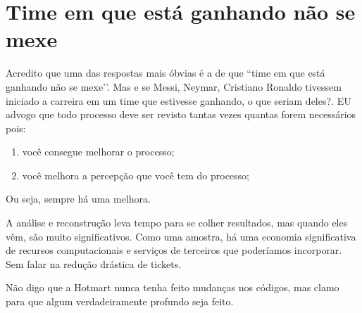 \section{Time em que está ganhando não se mexe}

Acredito que uma das respostas mais óbvias é a de que ``time em que está ganhando não se mexe’’. Mas e se Messi, Neymar, Cristiano Ronaldo tivessem iniciado a carreira em um time que estivesse ganhando, o que seriam deles?. EU advogo que todo processo deve ser revisto tantas vezes quantas forem necessários pois:
\begin{enumerate}
    \item você consegue melhorar o processo;
    \item você melhora a percepção que você tem do processo;
\end{enumerate}
Ou seja, sempre há uma melhora.

A análise e reconstrução leva tempo para se colher resultados, mas quando eles vêm, são muito significativos. Como uma amostra, há uma economia significativa de recursos computacionais e serviços de terceiros que poderíamos incorporar. Sem falar na redução drástica de tickets.

Não digo que a Hotmart nunca tenha feito mudanças nos códigos, mas clamo para que algum verdadeiramente profundo seja feito.
